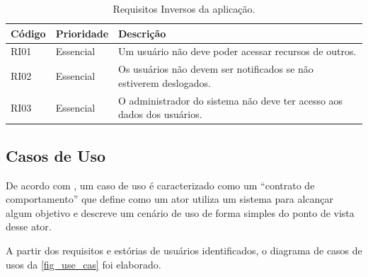 \begin{table}[htb]
    \begin{center}
        \ABNTEXfontereduzida
        \caption{Requisitos Inversos da aplicação.}
        \label{tab-req-inv}
        \begin{tabular}{p{1.1cm}|p{1.5cm}|p{10.5cm}}
            \textbf{Código} & \textbf{Prioridade} & \textbf{Descrição}         \\
            \hline
            RI01            & Essencial           &
            Um usuário não deve poder acessar recursos de outros.              \\
            \hline
            RI02            & Essencial           &
            Os usuários não devem ser notificados se não estiverem deslogados. \\
            \hline
            RI03            & Essencial           &
            O administrador do sistema não deve ter acesso aos dados dos usuários.
        \end{tabular}
    \end{center}
\end{table}

\newpage

\subsection{Casos de Uso}

De acordo com , um caso de uso é caracterizado como um ``contrato de comportamento'' que define como
um ator utiliza um sistema para alcançar algum objetivo e descreve um cenário de uso de forma simples do ponto de vista desse ator.

A partir dos requisitos e estórias de usuários identificados, o diagrama de casos de usos da \autoref{fig_use_cas} foi elaborado.

